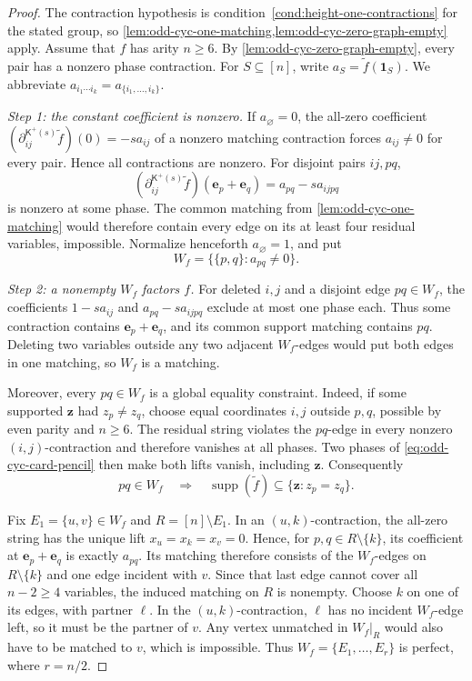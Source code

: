 \documentclass[11pt,letterpaper,onecolumn]{article}
\theoremstyle{plain}
\theoremstyle{definition}
\theoremstyle{remark}
\newcommand{\supp}{\operatorname{supp}}
\newcommand{\one}{\mathbf 1}
\begin{document}
	\begin{proof}
		The contraction hypothesis is condition~\ref{cond:height-one-contractions}
		for the stated group, so
		\cref{lem:odd-cyc-one-matching,lem:odd-cyc-zero-graph-empty} apply.
		Assume that \(f\) has arity \(n\ge6\).  By
		\cref{lem:odd-cyc-zero-graph-empty}, every pair has a nonzero phase contraction.
		For \(S\subseteq[n]\), write \(a_S=\widetilde f(\one_S)\).
		We abbreviate \(a_{i_1\cdots i_k}=a_{\{i_1,\ldots,i_k\}}\).
		
		\emph{Step 1: the constant coefficient is nonzero.}
		If \(a_\varnothing=0\), the all-zero coefficient
		\((\partial_{ij}^{\mathsf K^+(s)}\widetilde f)(0)=-sa_{ij}\) of a nonzero matching contraction forces
		\(a_{ij}\ne0\) for every pair.  Hence all contractions are nonzero.  For disjoint
		pairs \(ij,pq\),
		\[
		(\partial_{ij}^{\mathsf K^+(s)}\widetilde f)({\mathbf e}_p+{\mathbf e}_q)=a_{pq}-sa_{ijpq}
		\]
		is nonzero at some phase.  The common matching from
		\cref{lem:odd-cyc-one-matching} would therefore contain every edge on its
		at least four residual variables, impossible.  Normalize henceforth
		\(a_\varnothing=1\), and put
		\[
		W_f=\{\{p,q\}:a_{pq}\ne0\}.
		\]
		
		\emph{Step 2: a nonempty \(W_f\) factors \(f\).}
		For deleted \(i,j\) and a disjoint edge \(pq\in W_f\), the coefficients
		\(1-sa_{ij}\) and \(a_{pq}-sa_{ijpq}\) exclude at most one phase each.
		Thus some contraction contains \({\mathbf e}_p+{\mathbf e}_q\), and its common support matching
		contains \(pq\).  Deleting two variables outside any two adjacent
		\(W_f\)-edges would put both edges in one matching, so \(W_f\) is a
		matching.
		
		Moreover, every \(pq\in W_f\) is a global equality constraint.  Indeed, if
		some supported \({\mathbf z}\) had \(z_p\ne z_q\), choose equal coordinates \(i,j\)
		outside \(p,q\), possible by even parity and \(n\ge6\).  The residual string
		violates the \(pq\)-edge in every nonzero \((i,j)\)-contraction and therefore
		vanishes at all phases.  Two phases of
		\cref{eq:odd-cyc-card-pencil} then make both lifts vanish, including \({\mathbf z}\).
		Consequently
		\begin{equation}
			pq\in W_f\quad\Longrightarrow\quad
			\supp(\widetilde f)\subseteq\{{\mathbf z}:z_p=z_q\}.
			\label{eq:odd-cyc-global-equality}
		\end{equation}
		
		Fix \(E_1=\{u,v\}\in W_f\) and \(R=[n]\setminus E_1\).  In an
		\((u,k)\)-contraction, the all-zero string has the unique lift
		\(x_u=x_k=x_v=0\). Hence, for \(p,q\in R\setminus\{k\}\), its coefficient
		at \({\mathbf e}_p+{\mathbf e}_q\) is exactly \(a_{pq}\).  Its matching therefore consists of
		the \(W_f\)-edges on \(R\setminus\{k\}\) and one edge incident with \(v\).
		Since that last edge cannot cover all \(n-2\ge4\) variables, the induced
		matching on \(R\) is nonempty.  Choose \(k\) on one of its edges, with
		partner \(\ell\).  In the \((u,k)\)-contraction, \(\ell\) has no incident
		\(W_f\)-edge left, so it must be the partner of \(v\).  Any vertex
		unmatched in \(W_f|_R\) would also have to be matched to \(v\), which is
		impossible.  Thus \(W_f=\{E_1,\ldots,E_r\}\) is perfect, where \(r=n/2\).
		

\end{proof}
\end{document}
